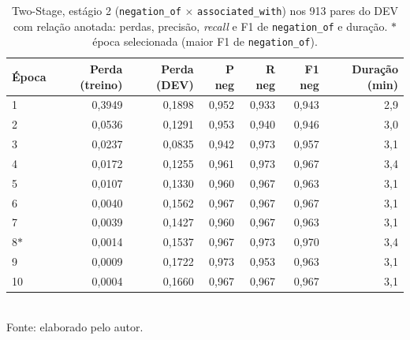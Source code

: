 \begin{table}[htbp]
  \centering
  \caption{Two-Stage, estágio 2 (\texttt{negation\_of} $\times$ \texttt{associated\_with}) nos 913 pares do DEV com relação anotada: perdas, precisão, \emph{recall} e F1 de \texttt{negation\_of} e duração. $\ast$ época selecionada (maior F1 de \texttt{negation\_of}).}
  \label{tab:dev_estagio2}
  \begin{tabular}{lrrrrrr}
  \toprule
  Época & Perda (treino) & Perda (DEV) & P neg & R neg & F1 neg & Duração (min) \\
  \midrule
1 & 0{,}3949 & 0{,}1898 & 0{,}952 & 0{,}933 & 0{,}943 & 2{,}9 \\
2 & 0{,}0536 & 0{,}1291 & 0{,}953 & 0{,}940 & 0{,}946 & 3{,}0 \\
3 & 0{,}0237 & 0{,}0835 & 0{,}942 & 0{,}973 & 0{,}957 & 3{,}1 \\
4 & 0{,}0172 & 0{,}1255 & 0{,}961 & 0{,}973 & 0{,}967 & 3{,}4 \\
5 & 0{,}0107 & 0{,}1330 & 0{,}960 & 0{,}967 & 0{,}963 & 3{,}1 \\
6 & 0{,}0040 & 0{,}1562 & 0{,}967 & 0{,}967 & 0{,}967 & 3{,}1 \\
7 & 0{,}0039 & 0{,}1427 & 0{,}960 & 0{,}967 & 0{,}963 & 3{,}1 \\
8$\ast$ & 0{,}0014 & 0{,}1537 & 0{,}967 & 0{,}973 & 0{,}970 & 3{,}4 \\
9 & 0{,}0009 & 0{,}1722 & 0{,}973 & 0{,}953 & 0{,}963 & 3{,}1 \\
10 & 0{,}0004 & 0{,}1660 & 0{,}967 & 0{,}967 & 0{,}967 & 3{,}1 \\
  \bottomrule
  \end{tabular}\\[4pt]
  {\footnotesize Fonte: elaborado pelo autor.}
\end{table}
